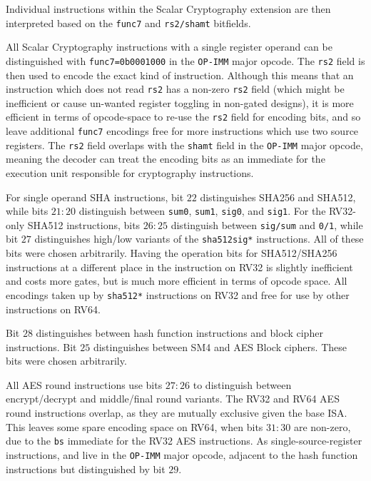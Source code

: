 Individual instructions within the Scalar Cryptography extension
are then interpreted based on the {\tt func7} and {\tt rs2/shamt} bitfields.

All Scalar Cryptography instructions with a single register operand can be
distinguished with {\tt func7=0b0001000} in the {\tt OP-IMM} major opcode.
The {\tt rs2} field is then used to encode the exact kind of instruction.
Although this means that an instruction which does not read {\tt rs2} has
a non-zero {\tt rs2} field (which might be inefficient or cause un-wanted
register toggling in non-gated designs),
it is more efficient in terms of opcode-space to re-use the {\tt rs2} field
for encoding bits, and
so leave additional {\tt func7} encodings free for more instructions which
use two source registers.
The {\tt rs2} field overlaps with the {\tt shamt} field in the {\tt OP-IMM}
major opcode, meaning the decoder can treat the encoding bits as an
immediate for the execution unit responsible for cryptography
instructions.

For single operand SHA instructions,
bit $22$ distinguishes SHA256 and SHA512, while
bits $21:20$ distinguish between
{\tt sum0},
{\tt sum1},
{\tt sig0},
and
{\tt sig1}.
For the RV32-only SHA512 instructions,
bits $26:25$ distinguish between {\tt sig/sum} and {\tt 0/1},
while bit $27$ distinguishes high/low variants of the {\tt sha512sig*}
instructions.
All of these bits were chosen arbitrarily.
Having the operation bits for SHA512/SHA256 instructions at a different place
in the instruction on RV32 is slightly inefficient and costs more gates,
but is much more efficient in terms of opcode space.
All encodings taken up by {\tt sha512*} instructions on RV32 and
free for use by other instructions on RV64.

Bit $28$ distinguishes between hash function instructions and block
cipher instructions.
Bit $25$ distinguishes between SM4 and AES Block ciphers.
These bits were chosen arbitrarily.

All AES round instructions use bits $27:26$ to distinguish between
encrypt/decrypt and middle/final round variants.
The RV32 and RV64 AES round instructions overlap, as they are mutually
exclusive given the base ISA.
This leaves some spare encoding space on RV64, when bits $31:30$
are non-zero, due to the {\tt bs} immediate for the RV32 AES instructions.
As single-source-register instructions,
 and 
live in the {\tt OP-IMM} major opcode, adjacent to the hash function
instructions but distinguished by bit $29$.

